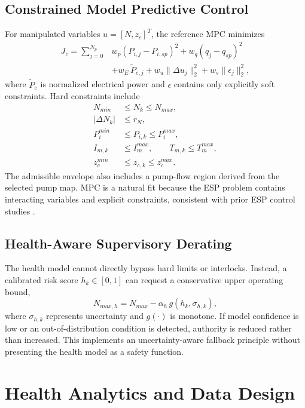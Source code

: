 \documentclass[conference]{IEEEtran}
\begin{document}
\subsection{Constrained Model Predictive Control}
For manipulated variables $u=[N,z_c]^T$, the reference MPC minimizes
\begin{equation}
\begin{split}
J_c=\sum_{j=0}^{N_p} & w_p(P_{i,j}-P_{i,sp})^2
+w_q(q_j-q_{sp})^2 \\
&+w_E\,\tilde P_{e,j}+w_u\|\Delta u_j\|_2^2
+w_s\|\epsilon_j\|_2^2,
\end{split}
\label{eq:mpc}
\end{equation}
where $\tilde P_e$ is normalized electrical power and $\epsilon$ contains only explicitly soft constraints. Hard constraints include
\begin{align}
N_{min} &\le N_k\le N_{max}, \\
|\Delta N_k| &\le r_N, \\
P_i^{min} &\le P_{i,k}\le P_i^{max}, \\
I_{m,k} &\le I_m^{max}, \qquad T_{m,k}\le T_m^{max}, \\
z_c^{min} &\le z_{c,k}\le z_c^{max}.
\end{align}
The admissible envelope also includes a pump-flow region derived from the selected pump map. MPC is a natural fit because the ESP problem contains interacting variables and explicit constraints, consistent with prior ESP control studies \cite{pavlov2014,binder2014,krishnamoorthy2016}.

\subsection{Health-Aware Supervisory Derating}
The health model cannot directly bypass hard limits or interlocks. Instead, a calibrated risk score $h_k\in[0,1]$ can request a conservative upper operating bound,
\begin{equation}
N_{max,h}=N_{max}-\alpha_h\,g(h_k,\sigma_{h,k}),
\label{eq:derate}
\end{equation}
where $\sigma_{h,k}$ represents uncertainty and $g(\cdot)$ is monotone. If model confidence is low or an out-of-distribution condition is detected, authority is reduced rather than increased. This implements an uncertainty-aware fallback principle without presenting the health model as a safety function.

\section{Health Analytics and Data Design}
\end{document}
